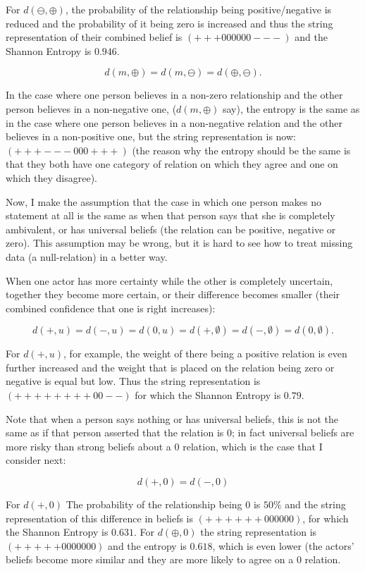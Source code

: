 \documentclass[12pt]{article}
\begin{document}
For $d(\ominus, \oplus)$, the probability of the relationship being positive/negative is reduced and the probability of it being zero is increased and thus the string representation of their combined belief is $(+++000000---)$ and the Shannon Entropy is $0.946$. 

$$d(m, \oplus)=d(m, \ominus)=d(\oplus, \ominus).$$

In the case where one person believes in a non-zero relationship and the other person believes in a non-negative one, ($d(m, \oplus)$ say), the entropy is the same as in the case where one person believes in a non-negative relation and the other believes in a non-positive one, but the string representation is now: $(+++---000+++)$ (the reason why the entropy should be the same is that they both have one category of relation on which they agree and one on which they disagree). 

Now, I make the assumption that the case in which one person makes no statement at all is the same as when that person says that she is completely ambivalent, or has universal beliefs (the relation can be positive, negative or zero). This assumption may be wrong, but it is hard to see how to treat missing data (a null-relation) in a better way. 

When one actor has more certainty while the other is completely uncertain, together they become more certain, or their difference becomes smaller (their combined confidence that one is right increases):

$$d(+, u)=d(-,u)=d(0, u)=d(+, \emptyset)=d(-, \emptyset)=d(0, \emptyset).$$

For $d(+, u)$, for example, the weight of there being a positive relation is even further increased and the weight that is placed on the relation being zero or negative is equal but low. Thus the string representation is $(++++++++00--)$ for which the Shannon Entropy is $0.79$. 

Note that when a person says nothing or has universal beliefs, this is not the same as if that person asserted that the relation is $0$; in fact universal beliefs are more risky than strong beliefs about a $0$ relation, which is the case that I consider next: 

$$d(+, 0)=d(-, 0)$$

For $d(+, 0)$ The probability of the relationship being $0$ is $50\%$ and the string representation of this difference in beliefs is $(++++++000000)$, for which the Shannon Entropy is $0.631$. For $d(\oplus, 0)$ the string representation is $(+++++0000000)$ and the entropy is $0.618$, which is even lower (the actors' beliefs become more similar and they are more likely to agree on a $0$ relation. 
\end{document}
